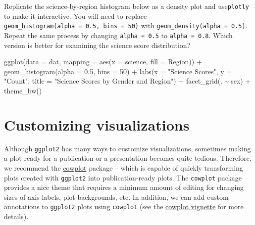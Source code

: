 \documentclass[
]{book}
\newenvironment{Shaded}{\begin{snugshade}}{\end{snugshade}}
\newcommand{\AttributeTok}[1]{\textcolor[rgb]{0.77,0.63,0.00}{#1}}
\newcommand{\DecValTok}[1]{\textcolor[rgb]{0.00,0.00,0.81}{#1}}
\newcommand{\FloatTok}[1]{\textcolor[rgb]{0.00,0.00,0.81}{#1}}
\newcommand{\FunctionTok}[1]{\textcolor[rgb]{0.00,0.00,0.00}{#1}}
\newcommand{\NormalTok}[1]{#1}
\newcommand{\SpecialCharTok}[1]{\textcolor[rgb]{0.00,0.00,0.00}{#1}}
\newcommand{\StringTok}[1]{\textcolor[rgb]{0.31,0.60,0.02}{#1}}
\begin{document}
Replicate the science-by-region histogram below as a density plot and use\texttt{plotly} to make it interactive. You will need to replace \texttt{geom\_histogram(alpha\ =\ 0.5,\ bins\ =\ 50)} with \texttt{geom\_density(alpha\ =\ 0.5)}. Repeat the same process by changing \texttt{alpha\ =\ 0.5} to \texttt{alpha\ =\ 0.8}. Which version is better for examining the science score distribution?

\begin{Shaded}
\begin{Highlighting}[]
\FunctionTok{ggplot}\NormalTok{(}\AttributeTok{data =}\NormalTok{ dat,}
       \AttributeTok{mapping =} \FunctionTok{aes}\NormalTok{(}\AttributeTok{x =}\NormalTok{ science, }\AttributeTok{fill =}\NormalTok{ Region)) }\SpecialCharTok{+}
  \FunctionTok{geom\_histogram}\NormalTok{(}\AttributeTok{alpha =} \FloatTok{0.5}\NormalTok{, }\AttributeTok{bins =} \DecValTok{50}\NormalTok{) }\SpecialCharTok{+}
  \FunctionTok{labs}\NormalTok{(}\AttributeTok{x =} \StringTok{"Science Scores"}\NormalTok{, }\AttributeTok{y =} \StringTok{"Count"}\NormalTok{,}
       \AttributeTok{title =} \StringTok{"Science Scores by Gender and Region"}\NormalTok{) }\SpecialCharTok{+}
  \FunctionTok{facet\_grid}\NormalTok{(. }\SpecialCharTok{\textasciitilde{}}\NormalTok{ sex) }\SpecialCharTok{+}
  \FunctionTok{theme\_bw}\NormalTok{()}
\end{Highlighting}
\end{Shaded}

\hypertarget{customizing-visualizations}{%
\section{Customizing visualizations}\label{customizing-visualizations}}

Although \texttt{ggplot2} has many ways to customize visualizations, sometimes making a plot ready for a publication or a presentation becomes quite tedious. Therefore, we recommend the \href{https://cran.r-project.org/web/packages/cowplot/index.html}{cowplot} package -- which is capable of quickly transforming plots created with \texttt{ggplot2} into publication-ready plots. The \texttt{cowplot} package provides a nice theme that requires a minimum amount of editing for changing sizes of axis labels, plot backgrounds, etc. In addition, we can add custom annotations to \texttt{ggplot2} plots using \texttt{cowplot} (see the \href{https://cran.r-project.org/web/packages/cowplot/vignettes/introduction.html}{cowplot vignette} for more details).
\end{document}

